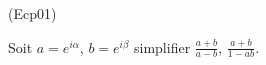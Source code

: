 \begin{tiny}(Ecp01)\end{tiny}\label{cp01}
Soit $a=e^{i\alpha }$, $b=e^{i\beta }$ simplifier $\frac{a+b}{a-b}$, $%
\frac{a+b}{1-ab}$.